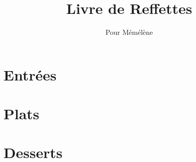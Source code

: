 \documentclass{recipe-book}
\title{Livre de Reffettes}
\author{Pour Mémélène}
\date{}
\begin{document}
\chapter{Entrées}

%
\chapter{Plats}

\chapter{Desserts}
\end{document}
